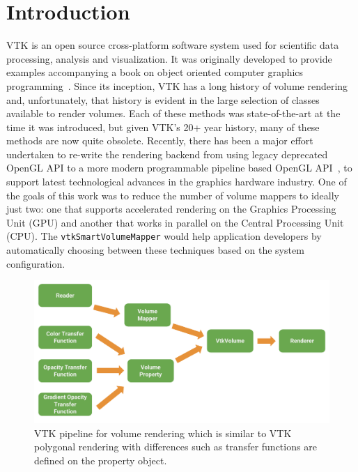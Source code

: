 \section{Introduction}
\label{introduction}
VTK is an open source cross-platform software system used for scientific data
processing, analysis and visualization. It was originally developed to provide
examples accompanying a book on object oriented computer graphics
programming~\citep{schroeder_visualization_2006, geveci_vtk_2012}.  Since its
inception, VTK has a long history of volume rendering and, unfortunately, that
history is evident in the large selection of classes available to render
volumes. Each of these methods was state-of-the-art at the time it was
introduced, but given VTK's 20+ year history, many of these methods are now
quite obsolete. Recently, there has been a major
effort~\citep{hanwell_visualization_2015} undertaken to re-write the rendering
backend from using legacy deprecated OpenGL API to a more modern programmable
pipeline based OpenGL API~\citep{shreiner_opengl_2013}, to support latest
technological advances in the graphics hardware industry. One of the goals of
this work was to reduce the number of volume mappers to ideally just two: one
that supports accelerated rendering on the Graphics Processing Unit (GPU) and
another that works in parallel on the Central Processing Unit (CPU). The
\texttt{vtkSmartVolumeMapper} would help application developers by automatically
choosing between these techniques based on the system configuration.

\begin{figure}[ht]
  \centering
  \includegraphics[width=\columnwidth]{vtk_volume_pipeline.pdf}
  \caption{VTK pipeline for volume rendering which is similar to VTK polygonal
    rendering with differences such as transfer functions are defined on the
    property object.}
  \label{fig:pipeline}
\end{figure}%

